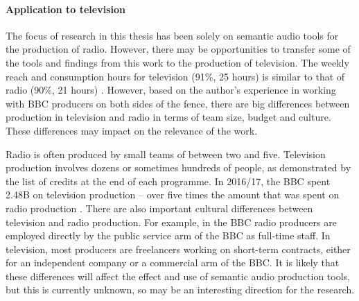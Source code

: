 \paragraph{Application to television}

The focus of research in this thesis has been solely on semantic audio tools for the production of radio. However,
there may be opportunities to transfer some of the tools and findings from this work to the production of television.
The weekly reach and consumption hours for television (91\%, 25 hours) is similar to that of radio (90\%, 21 hours)
\citep[pp.  82, 119]{Ofcom2017}.  However, based on the author's experience in working with BBC producers on both sides
of the fence, there are big differences between production in television and radio in terms of team size, budget and
culture. These differences may impact on the relevance of the work.

Radio is often produced by small teams of between two and five. Television production involves dozens or sometimes
hundreds of people, as demonstrated by the list of credits at the end of each programme.  In 2016/17, the BBC spent
\textsterling2.48B on television production -- over five times the amount that was spent on radio production \citep[pp.
39, 111]{Ofcom2017}. There are also important cultural differences between television and radio production. For
example, in the BBC radio producers are employed directly by the public service arm of the BBC as full-time staff. In
television, most producers are freelancers working on short-term contracts, either for an independent company or a
commercial arm of the BBC. It is likely that these differences will affect the effect and use of semantic audio
production tools, but this is currently unknown, so may be an interesting direction for the research.





